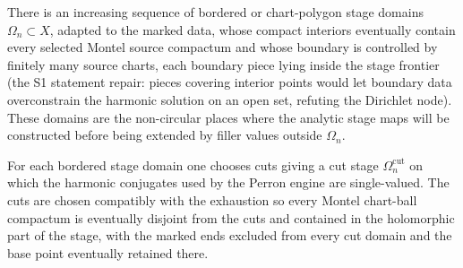 \begin{lemma}
\label{lem:stage-bordered-exhaustion-domains}
There is an increasing sequence of bordered or chart-polygon stage domains
\(\Omega_n\subset X\), adapted to the marked data, whose compact interiors
eventually contain every selected Montel source compactum and whose boundary is
controlled by finitely many source charts, each boundary piece lying inside
the stage frontier (the S1 statement repair: pieces covering interior points
would let boundary data overconstrain the harmonic solution on an open set,
refuting the Dirichlet node).  These domains are the non-circular
places where the analytic stage maps will be constructed before being extended
by filler values outside \(\Omega_n\).
\end{lemma}

\begin{lemma}
\label{lem:stage-cut-domain-conjugate-control}
For each bordered stage domain one chooses cuts giving a cut stage
\(\Omega_n^{\mathrm{cut}}\) on which the harmonic conjugates used by the
Perron engine are single-valued.  The cuts are chosen compatibly with the
exhaustion so every Montel chart-ball compactum is eventually disjoint from the
cuts and contained in the holomorphic part of the stage, with the marked ends
excluded from every cut domain and the base point eventually retained there.
\end{lemma}

